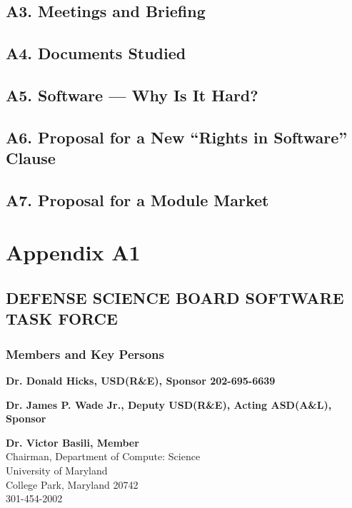 \documentclass[11pt,final]{article}
\begin{document}
\subsection*{A3. Meetings and Briefing}

\subsection*{A4. Documents Studied}

\subsection*{A5. Software — Why Is It Hard?}

\subsection*{A6. Proposal for a New “Rights in Software” Clause}

\subsection*{A7. Proposal for a Module Market}

\newpage

\section*{Appendix A1}
\begin{centering}

\subsection*{DEFENSE SCIENCE BOARD SOFTWARE TASK FORCE}

\subsubsection*{Members and Key Persons}
\end{centering}

\textbf{Dr. Donald Hicks, USD(R\&E), Sponsor 202-695-6639}

\medskip

\textbf{Dr. James P. Wade Jr., Deputy USD(R\&E), Acting ASD(A\&L), Sponsor}

\medskip

\textbf{Dr. Victor Basili, Member}\\
\hspace*{2cm}Chairman, Department of Compute: Science\\
\hspace*{2cm}University of Maryland\\
\hspace*{2cm}College Park, Maryland 20742\\
\hspace*{2cm}301-454-2002
\end{document}
